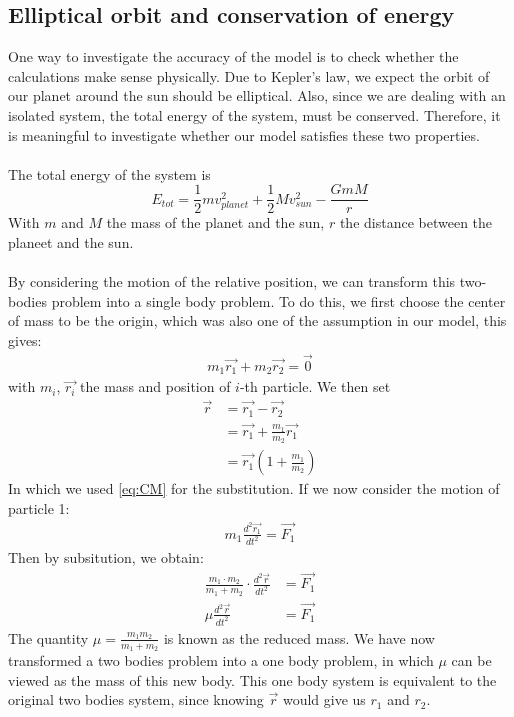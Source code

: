 \subsection{Elliptical orbit and conservation of energy}
One way to investigate the accuracy of the model is to check whether the calculations make sense physically. Due to Kepler's law, we expect the orbit of our planet around the sun should be elliptical. 
Also, since we are dealing with an isolated system, the total energy of the system, must be conserved. 
Therefore, it is meaningful to investigate whether our model satisfies these two properties.\\ 
\\
The total energy of the system is \cite{Energy}
\[E_{tot}=\frac{1}{2}mv_{planet}^2+\frac{1}{2}Mv_{sun}^2-\frac{GmM}{r}\]
With $m$ and $M$ the mass of the planet and the sun, $r$ the distance between the planeet and the sun.\\
\\
By considering the motion of the relative position, we can transform this two-bodies problem into a single body problem\cite{reducedmass}. To do this, we first choose the center of mass to be the origin, which was also one of the assumption in our model, this gives:
\begin{align}
m_1\vec{r_1}+m_2\vec{r_2}=\vec{0}\label{eq:CM} 
\end{align}
with $m_i$, $\vec{r_i}$ the mass and position of $i$-th particle. We then set
\begin{align*}
\vec{r}&=\vec{r_1}-\vec{r_2}\\ 
	   &=\vec{r_1}+\frac{m_1}{m_2}\vec{r_1}\\
	   &=\vec{r_1}(1+\frac{m_1}{m_2}) 
\end{align*}
In which we used \eqref{eq:CM} for the substitution. If we now consider the motion of particle 1:
\begin{align*}
m_1\frac{d^2\vec{r_1}}{dt^2}=\vec{F_1}
\end{align*}
Then by subsitution, we obtain:
\begin{align*}
\frac{m_1\cdot m_2}{m_1+m_2}\cdot\frac{d^2 \vec{r}}{dt^2}&=\vec{F_1}\\
\mu\frac{d^2 \vec{r}}{dt^2}&=\vec{F_1}
\end{align*}
The quantity $\mu=\frac{m_1m_2}{m_1+m_2}$ is known as the reduced mass. We have now transformed a two bodies problem into a one body problem, in which $\mu$ can be viewed as the mass of this new body. This one body system is equivalent to the original two bodies system, since knowing $\vec{r}$ would give us $r_1$ and $r_2$. \\
